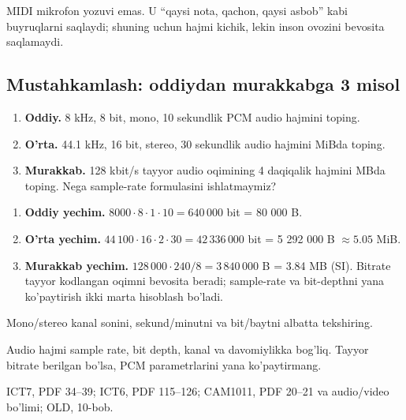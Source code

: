 \documentclass[11pt,a4paper,oneside]{book}
\begin{document}
\begin{warningbox}
MIDI mikrofon yozuvi emas. U ``qaysi nota, qachon, qaysi asbob'' kabi buyruqlarni saqlaydi; shuning uchun hajmi kichik, lekin inson ovozini bevosita saqlamaydi.
\end{warningbox}

\subsection{Mustahkamlash: oddiydan murakkabga 3 misol}
\begin{taskbox}
\begin{enumerate}[leftmargin=7mm]
\item \textbf{Oddiy.} 8 kHz, 8 bit, mono, 10 sekundlik PCM audio hajmini toping.
\item \textbf{O'rta.} 44.1 kHz, 16 bit, stereo, 30 sekundlik audio hajmini MiBda toping.
\item \textbf{Murakkab.} 128 kbit/s tayyor audio oqimining 4 daqiqalik hajmini MBda toping. Nega sample-rate formulasini ishlatmaymiz?
\end{enumerate}
\end{taskbox}

\begin{solutionbox}
\begin{enumerate}[leftmargin=7mm]
\item \textbf{Oddiy yechim.} $8000\cdot8\cdot1\cdot10=640\,000$ bit = 80 000 B.
\item \textbf{O'rta yechim.} $44\,100\cdot16\cdot2\cdot30=42\,336\,000$ bit = 5 292 000 B $\approx5.05$ MiB.
\item \textbf{Murakkab yechim.} $128\,000\cdot240/8=3\,840\,000$ B = 3.84 MB (SI). Bitrate tayyor kodlangan oqimni bevosita beradi; sample-rate va bit-depthni yana ko'paytirish ikki marta hisoblash bo'ladi.
\end{enumerate}
\end{solutionbox}
\begin{attest}Mono/stereo kanal sonini, sekund/minutni va bit/baytni albatta tekshiring.\end{attest}

\begin{summarybox}
Audio hajmi sample rate, bit depth, kanal va davomiylikka bog'liq. Tayyor bitrate berilgan bo'lsa, PCM parametrlarini yana ko'paytirmang.
\end{summarybox}
\begin{sourcebox}
ICT7, PDF 34--39; ICT6, PDF 115--126; CAM1011, PDF 20--21 va audio/video bo'limi; OLD, 10-bob.
\end{sourcebox}
\end{document}
